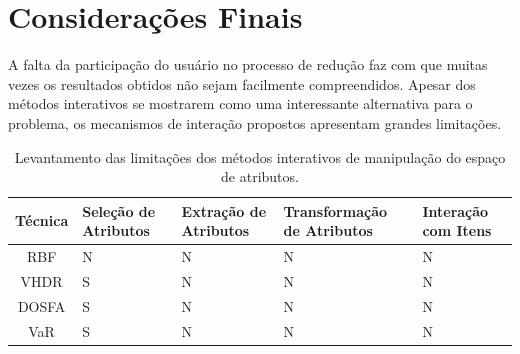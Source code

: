 
\section{Considerações Finais}

A falta da participação do usuário no processo de redução faz com que muitas vezes os resultados obtidos não sejam facilmente compreendidos. Apesar dos métodos interativos se mostrarem como uma interessante alternativa para o problema, os mecanismos de interação propostos apresentam grandes limitações. 





\begin{table}
    \centering
    \caption {Levantamento das limitações dos métodos interativos de manipulação do espaço de atributos.}
    \begin{tabular}{|c|C{2cm}|C{2.5cm}|C{3cm}|C{2cm}|}
        \hline
        \textbf{Técnica} & 
        \textbf{Seleção de Atributos} &
        \textbf{Extração de Atributos} &
        \textbf{Transformação de Atributos} &
        \textbf{Interação com Itens} 
        \\ \hline
        RBF     & N & N & N & N \\ \hline
        VHDR    & S & N & N & N \\ \hline
        DOSFA   & S & N & N & N \\ \hline
        VaR     & S & N & N & N \\ \hline
    \end{tabular}
\end{table}
